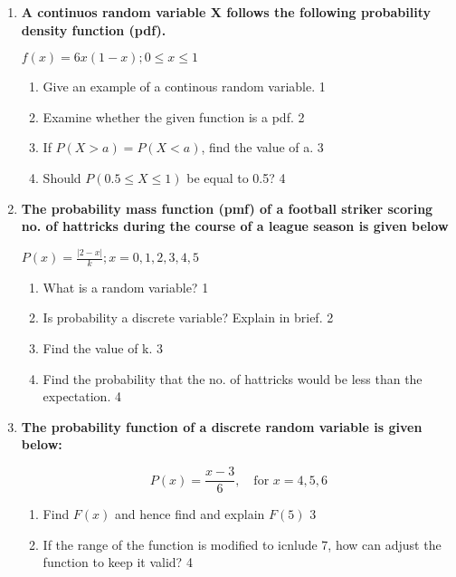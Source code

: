 \documentclass[a4paper,oneside, margin=1.4in]{book}
\begin{document}
\begin{enumerate}
   \item
	  \textbf{A continuos random variable X follows the following probability density function (pdf).} 
	  \begin{center}
	  $f(x) = 6x(1-x); 0\le x\le 1$
  \end{center}
  
  \begin{enumerate}
    \item
	Give an example of a continous random variable. \hfill 1
    \item
	Examine whether the given function is a pdf. \hfill 2
    \item  
	If $P(X>a) = P(X<a)$, find the value of a. \hfill 3
    \item
	Should $P(0.5 \le X \le 1)$  be equal to 0.5? \hfill 4
  \end{enumerate}
  
     \item
	  \textbf{The probability mass function (pmf) of a football striker scoring no. of hattricks during the course of a league season is given below}
	  
	  \begin{center}
	  $\displaystyle P(x)  = \frac{|2-x|}{k}; x = 0, 1, 2, 3, 4, 5$
	  \end{center}
  
  \begin{enumerate}
    \item
    What is a random variable? \hfill 1
    \item
		Is probability a discrete variable? Explain in brief. \hfill 2
    \item  
	Find the value of k.  \hfill 3
    \item
	Find the probability that the no. of hattricks would be less than the expectation. \hfill 4
  \end{enumerate}
  
   \item
	  \textbf{The probability function of a discrete random variable is given below:} 
  
   \begin{center}
	  \[
P(x) = \frac{x - 3}{6}, \quad \text{for } x = 4, 5, 6
\]
	  \end{center}
  
  \begin{enumerate}
    \item  
	Find $F(x)$ and hence find and explain $F(5)$ \hfill 3
    \item
	If the range of the function is modified to icnlude 7, how can adjust the function to keep it valid? \hfill 4
  \end{enumerate}


\end{enumerate}
\end{document}
